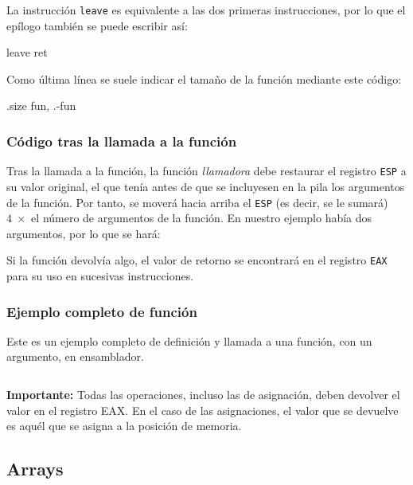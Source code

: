 \documentclass[11pt]{scrartcl}
\begin{document}
La instrucción \texttt{leave} es equivalente a las dos primeras instrucciones,
por lo que el epílogo también se puede escribir así:

\begin{gascode}
    leave
    ret  
\end{gascode}

Como última línea se suele indicar el tamaño de la función mediante este código: 

\begin{gascode}
    .size   fun, .-fun
\end{gascode}

\subsubsection{Código tras la llamada a la función}

Tras la llamada a la función, la función \textit{llamadora} debe restaurar el
registro \texttt{ESP} a su valor original, el que tenía antes de que se
incluyesen en la pila los argumentos de la función. Por tanto, se moverá hacia
arriba el \texttt{ESP} (es decir, se le sumará) $4 \;\times$ el número de
argumentos de la función. En nuestro ejemplo había dos argumentos, por lo que se
hará:


Si la función devolvía algo, el valor de retorno se encontrará en el registro
\texttt{EAX} para su uso en sucesivas instrucciones.

\subsubsection{Ejemplo completo de función}

Este es un ejemplo completo de definición y llamada a una función, con un
argumento, en ensamblador.

\inputminted{gas}{codes/ej_funcion.s}

\begin{framed}
  \textbf{Importante: }
  Todas las operaciones, incluso las de asignación, deben devolver el valor en
  el registro EAX. En el caso de las asignaciones, el valor que se devuelve es
  aquél que se asigna a la posición de memoria.
\end{framed}

\subsection{Arrays}
\end{document}
